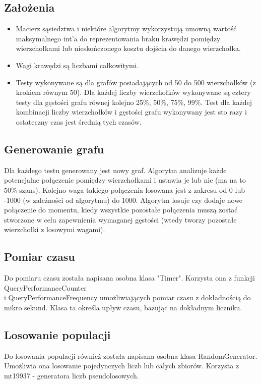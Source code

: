 \documentclass{article}
\begin{document}
    \subsection{Założenia}
        \begin{itemize}
            \item Macierz sąsiedztwa i niektóre algorytmy wykorzystują umowną wartość maksymalnego int'a do reprezentowania 
            braku krawędzi pomiędzy wierzchołkami lub nieskończonego kosztu dojścia do danego wierzchołka.
            \item Wagi krawędzi są liczbami całkowitymi.
            \item Testy wykonywane są dla grafów posiadających od 50 do 500 wierzchołków (z krokiem równym 50). Dla każdej liczby wierzchołków
            wykonywane są cztery testy dla gęstości grafu równej kolejno 25\%, 50\%, 75\%, 99\%. Test dla każdej kombinacji liczby wierzchołków
            i gęstości grafu wykonywany jest sto razy i ostateczny czas jest średnią tych czasów.
        \end{itemize}

    \subsection{Generowanie grafu}
    Dla każdego testu generowany jest nowy graf. Algorytm analizuje każde potencjalne połączenie pomiędzy wierzchołkami i ustawia je lub nie (ma na to 50\% szans). 
    Kolejno waga takiego połączenia losowana jest z zakresu od 0 lub -1000 (w zależności od algorytmu) do 1000. Algorytm losuje czy dodaje nowe połączenie do momentu,
    kiedy wszystkie pozostałe połączenia muszą zostać stworzone w celu zapewnienia wymaganej gęstości (wtedy tworzy pozostałe wierzchołki z losowymi wagami).
    
    \subsection{Pomiar czasu}
    Do pomiaru czasu została napisana osobna klasa "Timer". Korzysta ona z funkcji QueryPerformanceCounter\\
    i QueryPerformanceFrequency umożliwiających pomiar czasu z dokładnością do mikro sekund. Klasa ta określa upływ czasu, bazując na dokładnym liczniku.
    
    \subsection{Losowanie populacji}
    Do losowania populacji również została napisana osobna klasa RandomGenerator. Umożliwia ona losowanie pojedynczych liczb lub całych zbiorów.
    Korzysta z mt19937 - generatora liczb pseudolosowych.
\end{document}
